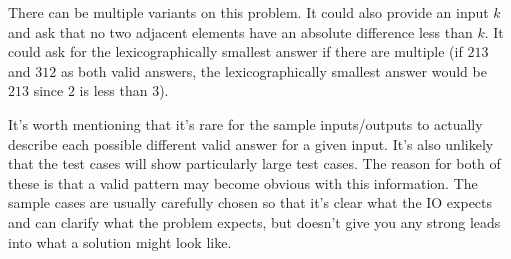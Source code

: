 There can be multiple variants on this problem. It could also provide an input $k$ and ask that no two adjacent elements have an absolute difference less than $k$. It could ask for the lexicographically smallest answer if there are multiple (if $2 1 3$ and $3 1 2$ as both valid answers, the lexicographically smallest answer would be $2 1 3$ since $2$ is less than $3$).

It's worth mentioning that it's rare for the sample inputs/outputs to actually describe each possible different valid answer for a given input. It's also unlikely that the test cases will show particularly large test cases. The reason for both of these is that a valid pattern may become obvious with this information. The sample cases are usually carefully chosen so that it's clear what the IO expects and can clarify what the problem expects, but doesn't give you any strong leads into what a solution might look like.

